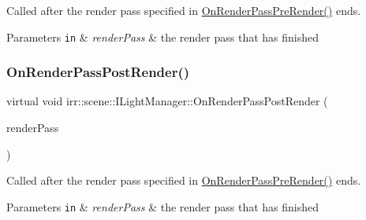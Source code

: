 Called after the render pass specified in \hyperlink{classirr_1_1scene_1_1ILightManager_a56eaec6a697659f40b4f29b681fbdfad}{On\+Render\+Pass\+Pre\+Render()} ends. 


\begin{DoxyParams}[1]{Parameters}
\mbox{\tt in}  & {\em render\+Pass} & the render pass that has finished \\
\hline
\end{DoxyParams}
\mbox{\label{classirr_1_1scene_1_1ILightManager_a189edbf3a16ebb3c82e5d9f93dd2b41b}} 
\subsubsection{\texorpdfstring{On\+Render\+Pass\+Post\+Render()}{OnRenderPassPostRender()}\hspace{0.1cm}{\footnotesize\ttfamily [2/2]}}
{\footnotesize\ttfamily virtual void irr\+::scene\+::\+I\+Light\+Manager\+::\+On\+Render\+Pass\+Post\+Render (\begin{DoxyParamCaption}\item[{\hyperlink{namespaceirr_1_1scene_a7862269bd1abc123929d4dbb8200d67f}{E\+\_\+\+S\+C\+E\+N\+E\+\_\+\+N\+O\+D\+E\+\_\+\+R\+E\+N\+D\+E\+R\+\_\+\+P\+A\+SS}}]{render\+Pass }\end{DoxyParamCaption})\hspace{0.3cm}{\ttfamily [pure virtual]}}



Called after the render pass specified in \hyperlink{classirr_1_1scene_1_1ILightManager_a56eaec6a697659f40b4f29b681fbdfad}{On\+Render\+Pass\+Pre\+Render()} ends. 


\begin{DoxyParams}[1]{Parameters}
\mbox{\tt in}  & {\em render\+Pass} & the render pass that has finished \\
\hline
\end{DoxyParams}
\mbox{\label{classirr_1_1scene_1_1ILightManager_a56eaec6a697659f40b4f29b681fbdfad}} 
